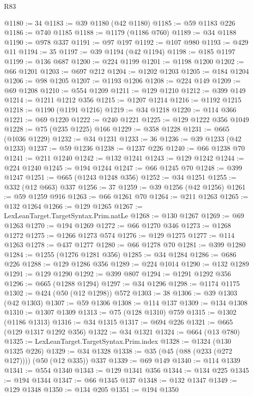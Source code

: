 \begin{lexlean}{R83}
\begin{coremodule}
@1180 := 34
@1183 := @39 @1180 (@42 @1180)
@1185 := @59 @1183 @226
@1186 := @740 @1185
@1188 := @1179 (@1186 @760)
@1189 := @34 @1188
@1190 := @978 @337
@1191 := @97 @197
@1192 := @107 @980
@1193 := @429 @11
@1194 := 35
@1197 := @39 @1194 (@42 @1194)
@1198 := @185 @1197
@1199 := @136 @687
@1200 := @224 @1199
@1201 := @1198 @1200
@1202 := @66 @1201
@1203 := @697 @212
@1204 := @1202 @1203
@1205 := @184 @1204
@1206 := @98 @1205
@1207 := @1193 @1206
@1208 := @224 @149
@1209 := @69 @1208
@1210 := @554 @1209
@1211 := @129 @1210
@1212 := @399 @149
@1214 := @1211 @1212 @356
@1215 := @1207 @1214
@1216 := @1192 @1215
@1218 := @1190 (@1191 @1216)
@1219 := @34 @1218
@1220 := @114 @366
@1221 := @69 @1220
@1222 := @240 @1221
@1225 := @129 @1222 @356 @1049
@1228 := @75 (@235 @1225) @166
@1229 := @358 @1228
@1231 := @665 (@1036 @1229)
@1232 := @34 @1231
@1233 := 36
@1236 := @39 @1233 (@42 @1233)
@1237 := @59 @1236
@1238 := @1237 @226
@1240 := @66 @1238 @70
@1241 := @211 @1240
@1242 := @132 @1241
@1243 := @129 @1242
@1244 := @224 @1240
@1245 := @194 @1244
@1247 := @66 @1245 @70
@1248 := @399 @1247
@1251 := @665 (@1243 @1248 @356)
@1252 := @34 @1251
@1255 := @332 (@12 @663) @337
@1256 := 37
@1259 := @39 @1256 (@42 @1256)
@1261 := @59 @1259 @916
@1263 := @66 @1261 @70
@1264 := @211 @1263
@1265 := @132 @1264
@1266 := @129 @1265
@1267 := LexLeanTarget.TargetSyntax.Prim.natLe
@1268 := @130 @1267
@1269 := @69 @1263
@1270 := @194 @1269
@1272 := @66 @1270 @346
@1273 := @1268 @1272
@1275 := @1266 @1273 @574
@1276 := @129 @1275
@1277 := @114 @1263
@1278 := @437 @1277
@1280 := @66 @1278 @70
@1281 := @399 @1280
@1284 := @1255 (@1276 @1281 @356)
@1285 := @34 @1284
@1286 := @686 @226
@1288 := @129 @1286 @356
@1289 := @224 @1014
@1290 := @132 @1289
@1291 := @129 @1290
@1292 := @399 @807
@1294 := @1291 @1292 @356
@1296 := @665 (@1288 @1294)
@1297 := @34 @1296
@1298 := @1174 @1175
@1302 := @424 (@50 (@12 @1298)) @572
@1303 := 38
@1306 := @39 @1303 (@42 @1303)
@1307 := @59 @1306
@1308 := @114 @137
@1309 := @134 @1308
@1310 := @1307 @1309
@1313 := @75 (@128 @1310) @759
@1315 := @1302 (@1186 @1313)
@1316 := @34 @1315
@1317 := @694 @226
@1321 := @665 (@129 @1317 @1292 @356)
@1322 := @34 @1321
@1324 := @664 (@13 @780)
@1325 := LexLeanTarget.TargetSyntax.Prim.index
@1328 := @1324 (@130 @1325 @226)
@1329 := @34 @1328
@1338 := @35 (@45 (@88 (@233 (@272 @127)))) (@50 (@12 @335)) @337
@1339 := @69 @149
@1340 := @114 @1339
@1341 := @554 @1340
@1343 := @129 @1341 @356
@1344 := @134 @225
@1345 := @194 @1344
@1347 := @66 @1345 @137
@1348 := @132 @1347
@1349 := @129 @1348
@1350 := @134 @205
@1351 := @194 @1350

\end{coremodule}
\end{lexlean}
